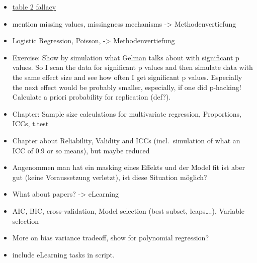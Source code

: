 \documentclass[
]{book}
\providecommand{\tightlist}{%
  \setlength{\itemsep}{0pt}\setlength{\parskip}{0pt}}
\begin{document}
\begin{itemize}
\tightlist
\item
  \href{https://onlinelibrary.wiley.com/doi/full/10.1111/cdoe.12617?casa_token=3IzTqt8cjzQAAAAA\%3AhKH7i2yhPi9tIVbOz89JVMT2yuSuyhejGLcJqXVINfgo7kjxlkzzBhqu3iH0zW7ClZef0ivw790enq1I}{table 2 fallacy}
\item
  mention missing values, missingness mechanisms -\textgreater{} Methodenvertiefung
\item
  Logistic Regression, Poisson, -\textgreater{} Methodenvertiefung
\item
  Exercise: Show by simulation what Gelman talks about with significant p values. So I scan the data
  for significant p values and then simulate data with the same effect size and see how often
  I get significant p values. Especially the next effect would be probably smaller,
  especially, if one did p-hacking! Calculate a priori probability for replication (def?).
\item
  Chapter: Sample size calculations for multivariate regression, Proportions, ICCs, t.test
\item
  Chapter about Reliability, Validity and ICCs (incl.~simulation of what an ICC of 0.9 or so means), but maybe reduced
\item
  Angenommen man hat ein masking eines Effekts und der Model fit ist aber gut (keine Voraussetzung verletzt),
  ist diese Situation möglich?
\item
  What about papers? -\textgreater{} eLearning
\item
  AIC, BIC, cross-validation, Model selection (best subset, leaps\ldots.), Variable selection
\item
  More on bias variance tradeoff, show for polynomial regression?
\item
  include eLearning tasks in script.
\end{itemize}


\end{document}
